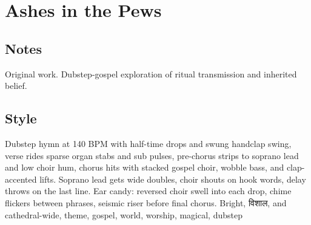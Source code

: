 \section{Ashes in the Pews}

\subsection{Notes}
Original work.
Dubstep-gospel exploration of ritual transmission and inherited belief.

\subsection{Style}
Dubstep hymn at 140 BPM with half-time drops and swung handclap swing, verse rides sparse organ stabs and sub pulses, pre-chorus strips to soprano lead and low choir hum, chorus hits with stacked gospel choir, wobble bass, and clap-accented lifts. Soprano lead gets wide doubles, choir shouts on hook words, delay throws on the last line. Ear candy: reversed choir swell into each drop, chime flickers between phrases, seismic riser before final chorus. Bright, विशाल, and cathedral-wide, theme, gospel, world, worship, magical, dubstep

